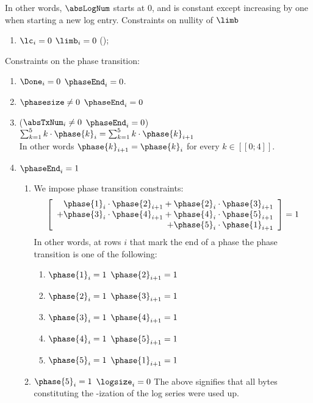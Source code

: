 In other words, $\absLogNum$ starts at 0, and is constant except increasing by one when starting a new log entry.
Constraints on nullity of $\limb$
\begin{enumerate}[resume]
    \item \If $\lc_{i}=0$ \Then $\limb_{i}=0$ (\trash);
\end{enumerate}
Constraints on the phase transition:
\begin{enumerate}[resume]
    \item \If $\Done_{i}=0$ \Then $\phaseEnd_{i}=0$.
    \item \If $\phasesize \neq 0$ \Then $\phaseEnd_{i}=0$
    \item \If ($\absTxNum_{i} \neq 0$ \et $\phaseEnd_{i}=0$) \Then $\sum_{k=1}^{5} k \cdot \phase{k}_{i} = \sum_{k=1}^{5} k \cdot \phase{k}_{i+1}$                             \\
        In other words $\phase{k}_{i+1}=\phase{k}_{i}$ for every $k \in [\![ 0 ; 4 ]\!]$.
    \item \If $\phaseEnd_{i}=1$ \Then
        \begin{enumerate}
            \item We impose phase transition constraints:
                \[
                    \left[
                        \begin{array}{r}
                            \phase{1}_{i} \cdot \phase{2}_{i+1}
                            + \phase{2}_{i} \cdot \phase{3}_{i+1} \\
                            + \phase{3}_{i} \cdot \phase{4}_{i+1} 
                            + \phase{4}_{i} \cdot \phase{5}_{i+1} \\
                            + \phase{5}_{i} \cdot \phase{1}_{i+1} \\
                        \end{array}
                        \right]
                    = 1
                \]
                In other words, at rows $i$ that mark the end of a phase the phase transition is one of the following:
                \begin{enumerate}
                    \item \If $\phase{1}_{i}=1$ \Then $\phase{2}_{i+1}=1$
                    \item \If $\phase{2}_{i}=1$ \Then $\phase{3}_{i+1}=1$
                    \item \If $\phase{3}_{i}=1$ \Then $\phase{4}_{i+1}=1$
                    \item \If $\phase{4}_{i}=1$ \Then $\phase{5}_{i+1}=1$
                    \item \If $\phase{5}_{i}=1$ \Then $\phase{1}_{i+1}=1$
                \end{enumerate}
            \item \If $\phase{5}_{i}=1$ \Then $\logsize_{i}=0$
                The above signifies that all bytes constituting the \rlp{}-ization of the log series were used up.
        \end{enumerate}
\end{enumerate}

